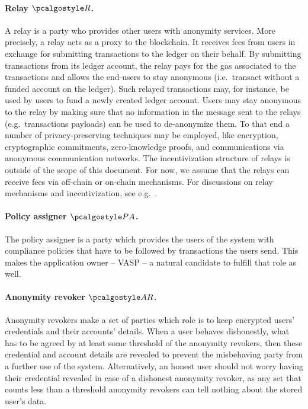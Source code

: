 \documentclass[runningheads,10pt]{llncs}
\numberwithin{equation}{section}
\begin{document}
\paragraph{Relay $\relay$.}
A relay is a party who provides other users with anonymity services. More
precisely, a relay acts as a proxy to the blockchain. It receives fees from
users in exchange for submitting transactions to the ledger on their behalf. By
submitting transactions from its ledger account, the relay pays for the gas
associated to the transactions and allows the end-users to stay anonymous
(i.e.~transact without a funded account on the ledger). Such relayed
transactions may, for instance, be used by users to fund a newly created ledger
account. Users may stay anonymous to the relay by making sure that no
information in the message sent to the relays (e.g.~transactions payloads) can
be used to de-anonymize them. To that end a number of privacy-preserving
techniques may be employed, like encryption, cryptographic commitments,
zero-knowledge proofs, and communications via anonymous communication networks. The incentivization structure of relays is outside of the scope of this 
document. For now, we assume that the relays can receive fees via off-chain or on-chain mechanisms. For discussions on relay mechanisms and incentivization, see e.g.~\cite{zeth-relay}.

\paragraph{Policy assigner $\polas$.}
The policy assigner is a party which provides the users of the system with
compliance policies that have to be followed by transactions the users send.
This makes the application owner -- VASP -- a natural candidate to fulfill that
role as well.

\paragraph{Anonymity revoker $\ar$.}
Anonymity revokers make a set of parties which role is to keep encrypted users'
credentials and their accounts' details. When a user behaves dishonestly, what
has to be agreed by at least some threshold of the anonymity revokers, then
these credential and account details are revealed to prevent the misbehaving
party from a further use of the system. Alternatively, an honest user should not
worry having their credential revealed in case of a dishonest anonymity revoker,
as any set that counts less than a threshold anonymity revokers can tell nothing
about the stored user's data.
\end{document}
